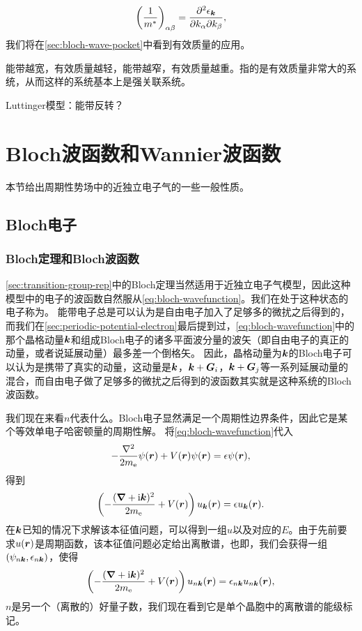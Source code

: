 \begin{equation}
    \left(\frac{1}{m^*}\right)_{\alpha \beta} = \pdv[2]{\epsilon_{\vb*{k}}}{k_\alpha}{k_\beta},
    \label{eq:effective-mass}
\end{equation}
我们将在\autoref{sec:bloch-wave-pocket}中看到有效质量的应用。

能带越宽，有效质量越轻，能带越窄，有效质量越重。指的是有效质量非常大的系统，从而这样的系统基本上是强关联系统。

Luttinger模型：能带反转？

\section{Bloch波函数和Wannier波函数}

本节给出周期性势场中的近独立电子气的一些一般性质。

\subsection{Bloch电子}\label{sec:bloch-electron}

\subsubsection{Bloch定理和Bloch波函数}

\autoref{sec:transition-group-rep}中的Bloch定理当然适用于近独立电子气模型，因此这种模型中的电子的波函数自然服从\eqref{eq:bloch-wavefunction}。我们在处于这种状态的电子称为。
能带电子总是可以认为是自由电子加入了足够多的微扰之后得到的，而我们在\autoref{sec:periodic-potential-electron}最后提到过，\eqref{eq:bloch-wavefunction}中的那个晶格动量$\vb*{k}$和组成Bloch电子的诸多平面波分量的波矢（即自由电子的真正的动量，或者说延展动量）最多差一个倒格矢。
因此，晶格动量为$\vb*{k}$的Bloch电子可以认为是携带了真实的动量，这动量是$\vb*{k}$，$\vb*{k}+\vb*{G}_i$，$\vb*{k} + \vb*{G}_j$等一系列延展动量的混合，而自由电子做了足够多的微扰之后得到的波函数其实就是这种系统的Bloch波函数。

我们现在来看$n$代表什么。Bloch电子显然满足一个周期性边界条件，因此它是某个等效单电子哈密顿量的周期性解。
将\eqref{eq:bloch-wavefunction}代入
\[
    -\frac{\laplacian}{2m_\text{e}} \psi(\vb*{r}) + V(\vb*{r}) \psi(\vb*{r}) = \epsilon \psi(\vb*{r}),
\]
得到
\begin{equation}
    \left( - \frac{(\grad+ \mathrm{i} \vb*{k})^2}{2m_\text{e}} + V(\vb*{r}) \right) u_{\vb*{k}}(\vb*{r}) = \epsilon u_{\vb*{k}}(\vb*{r}).
    \label{eq:block-energy-problem}
\end{equation}
在$\vb*{k}$已知的情况下求解该本征值问题，可以得到一组$u$以及对应的$E$。由于先前要求$u(\vb*{r})$是周期函数，该本征值问题必定给出离散谱，也即，我们会获得一组$(\psi_{n \vb*{k}}, \epsilon_{n \vb*{k}})$，使得
\begin{equation}
    \left( - \frac{(\grad+\mathrm{i} \vb*{k})^2}{2m_\text{e}} + V(\vb*{r}) \right) u_{n \vb*{k}}(\vb*{r}) = \epsilon_{n \vb*{k}} u_{n \vb*{k}}(\vb*{r}),
    \label{eq:eigen-function-bloch-u}
\end{equation}
$n$是另一个（离散的）好量子数，我们现在看到它是单个晶胞中的离散谱的能级标记。

